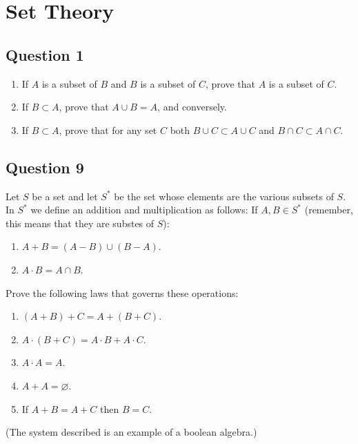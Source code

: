 \section{Set Theory}

\subsection{Question 1}

\begin{enumerate}
  \item If \( A \) is a subset of \( B \) and \( B \) is a subset of \( C \), prove that \( A \) is a subset of \( C \).
  \item If \( B \subset A\), prove that \( A \cup B = A \), and conversely.
    \item If \( B \subset A \), prove that for any set \( C \) both \( B \cup C \subset A \cup C \) and \( B \cap C  \subset A \cap C\).
\end{enumerate}


\subsection{Question 9}

Let \( S \) be a set and let \( S^{*} \) be the set whose elements are the various
subsets of \( S \). In \( S^{*} \) we define an addition and multiplication as follows:
If \( A, B \in S^{*} \) (remember, this means that they are substes of \( S \)):
\begin{enumerate}
  \item \( A + B = \left( A - B \right) \cup \left( B - A \right) \).
  \item \( A \cdot B = A \cap B \).
\end{enumerate}

Prove the following laws that governs these operations:

\begin{enumerate}
  \item \( \left( A + B \right) + C = A + \left( B + C \right) \).
  \item \( A \cdot \left( B + C \right) = A \cdot B + A \cdot C \).
  \item \( A \cdot A = A \).
  \item \( A + A = \varnothing \).
  \item If \( A + B = A + C  \) then \( B = C \).
\end{enumerate}
(The system described is an example of a boolean algebra.)

